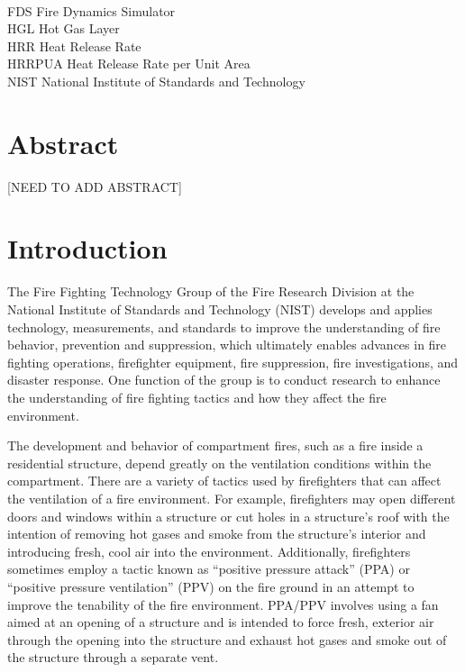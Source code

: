\documentclass[12pt,oneside]{book}
\begin{document}
\begin{tabbing}
\hspace{1.5in} \= \\
FDS \> Fire Dynamics Simulator \\
HGL \> Hot Gas Layer \\
HRR \> Heat Release Rate \\
HRRPUA \> Heat Release Rate per Unit Area \\
NIST \> National Institute of Standards and Technology \\
\end{tabbing}

\mainmatter

\chapter*{\centering Abstract}

[NEED TO ADD ABSTRACT]

\mainmatter

\chapter{Introduction}
\label{chap:Introduction}
The Fire Fighting Technology Group of the Fire Research Division at the National Institute of Standards and Technology (NIST) develops and applies technology, measurements, and standards to improve the understanding of fire behavior, prevention and suppression, which ultimately enables advances in fire fighting operations, firefighter equipment, fire suppression, fire investigations, and disaster response. One function of the group is to conduct research to enhance the understanding of fire fighting tactics and how they affect the fire environment. 

The development and behavior of compartment fires, such as a fire inside a residential structure, depend greatly on the ventilation conditions within the compartment. There are a variety of tactics used by firefighters that can affect the ventilation of a fire environment. For example, firefighters may open different doors and windows within a structure or cut holes in a structure's roof with the intention of removing hot gases and smoke from the structure's interior and introducing fresh, cool air into the environment. Additionally, firefighters sometimes employ a tactic known as ``positive pressure attack'' (PPA) or ``positive pressure ventilation'' (PPV) on the fire ground in an attempt to improve the tenability of the fire environment. PPA/PPV involves using a fan aimed at an opening of a structure and is intended to force fresh, exterior air through the opening into the structure and exhaust hot gases and smoke out of the structure through a separate vent. 
\end{document}
